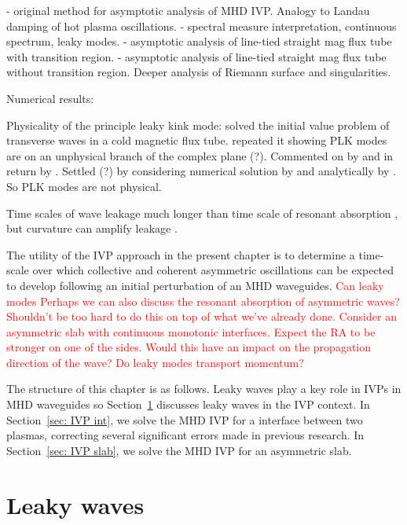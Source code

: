 \documentclass[12pt]{../style-files/ociamthesis}
\begin{document}
\cite{sed71} - original method for asymptotic analysis of MHD IVP. Analogy to Landau damping of hot plasma oscillations.
\cite{and_etal07} - spectral measure interpretation, continuous spectrum, leaky modes.
\cite{rud_etal02} - asymptotic analysis of line-tied straight mag flux tube with transition region.
\cite{rud_etal06} - asymptotic analysis of line-tied straight mag flux tube without transition region. Deeper analysis of Riemann surface and singularities.


Numerical results: \cite{ter_etal06}

Physicality of the principle leaky kink mode: \cite{cal03} solved the initial value problem of transverse waves in a cold magnetic flux tube. \cite{rud_etal06} repeated it showing PLK modes are on an unphysical branch of the complex plane (?). Commented on by \cite{cal06} and in return by \cite{rud_etal06b}. Settled (?) by considering numerical solution by \cite{ter_etal07} and analytically by \cite{and_etal07}. So PLK modes are not physical.

Time scales of wave leakage much longer than time scale of resonant absorption \citep{rob19}, but curvature can amplify leakage \citep{sel_etal07}.

\color{black}

The utility of the IVP approach in the present chapter is to determine a time-scale over which collective and coherent asymmetric oscillations can be expected to develop following an initial perturbation of an MHD waveguides. \textcolor{red}{Can leaky modes Perhaps we can also discuss the resonant absorption of asymmetric waves? Shouldn't be too hard to do this on top of what we've already done. Consider an asymmetric slab with continuous monotonic interfaces. Expect the RA to be stronger on one of the sides. Would this have an impact on the propagation direction of the wave? Do leaky modes transport momentum?}

The structure of this chapter is as follows. Leaky waves play a key role in IVPs in MHD waveguides so Section~\ref{sec: IVP leaky} discusses leaky waves in the IVP context. In Section~\ref{sec: IVP int}, we solve the MHD IVP for a interface between two plasmas, correcting several significant errors made in previous research. In Section~\ref{sec: IVP slab}, we solve the MHD IVP for an asymmetric slab.


\section{Leaky waves}
\label{sec: IVP leaky}
\end{document}
